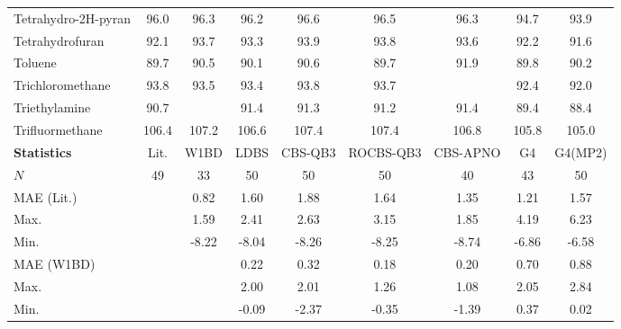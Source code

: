 \begin{longtable}{m{3.1cm} | c c c c c c c c}
Tetrahydro-2H-pyran              &  96.0     &   96.3   &   96.2   &    96.6     &    96.5    &   96.3   &  94.7   &    93.9   \\
Tetrahydrofuran                  &  92.1     &   93.7   &   93.3   &    93.9     &    93.8    &   93.6   &  92.2   &    91.6   \\
Toluene                          &  89.7     &   90.5   &   90.1   &    90.6     &    89.7    &   91.9   &  89.8   &    90.2   \\
Trichloromethane                 &  93.8     &   93.5   &   93.4   &    93.8     &    93.7    &          &  92.4   &    92.0   \\
Triethylamine                    &  90.7     &          &   91.4   &    91.3     &    91.2    &   91.4   &  89.4   &    88.4   \\
Trifluormethane                  & 106.4     &  107.2   &  106.6   &   107.4     &   107.4    &  106.8   & 105.8   &   105.0   \\
\hline
\textbf{Statistics}             & Lit.       &  W1BD    &    LDBS  &    CBS-QB3  &  ROCBS-QB3  &  CBS-APNO &    G4  &    G4(MP2)\\
\hline
$N$                              &    49     &     33   &     50   &      50     &      50     &     40    &    43   &     50   \\
MAE (Lit.)                       &           &   0.82   &   1.60   &    1.88     &    1.64     &   1.35    &  1.21   &   1.57   \\
Max.                             &           &   1.59   &   2.41   &    2.63     &    3.15     &   1.85    &  4.19   &   6.23   \\
Min.                             &           &  -8.22   &  -8.04   &   -8.26     &   -8.25     &  -8.74    & -6.86   &  -6.58   \\
MAE (W1BD)                       &           &          &   0.22   &    0.32     &    0.18     &   0.20    &  0.70   &   0.88   \\
Max.                             &           &          &   2.00   &    2.01     &    1.26     &   1.08    &  2.05   &   2.84   \\
Min.                             &           &          &  -0.09   &   -2.37     &   -0.35     &  -1.39    &  0.37   &   0.02   \\
\end{longtable}
